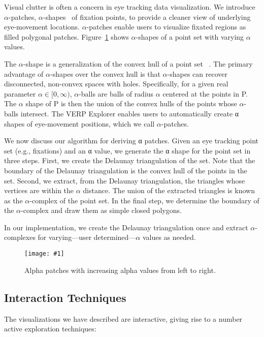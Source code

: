 \documentclass{sigchi}
\newcommand{\insertpicture}[2]{\begin{center}\texttt{[image: \#1]}\end{center}}
\begin{document}
Visual clutter is often a concern in eye tracking data visualization.  We
introduce $\alpha$-patches, $\alpha$-shapes~\cite{Edelsbrunner_1994} of 
fixation points, to provide a cleaner view of underlying eye-movement 
locations. $\alpha$-patches enable users to visualize fixated regions 
as filled polygonal patches. Figure~\ref{fig:alphapatch} shows $\alpha$-shapes 
of a point set with  varying $\alpha$ values.

The $\alpha$-shape is a generalization of the convex hull of a point set
~\cite{Edelsbrunner_1994}. The primary advantage of $\alpha$-shapes over 
the convex hull is that $\alpha$-shapes can recover disconnected, non-convex 
spaces with holes. Specifically, for a given real parameter $\alpha \in [0,\infty)$, 
$\alpha$-balls are balls of radius $\alpha$ centered at the points in P.
The $\alpha$ shape of P is then the union of the convex hulls of the
points whose $\alpha$-balls intersect. The VERP Explorer enables users
to automatically create α shapes of eye-movement positions, which we call
$\alpha$-patches.  

We now discuss our algorithm for deriving α patches. Given an eye
tracking point set (e.g., fixations) and an α value, we generate the α
shape for the point set in three steps. First, we create the Delaunay
triangulation of the set.  Note that the boundary of the Delaunay
triangulation is the convex hull of the points in the set. Second, we
extract, from the Delaunay triangulation, the triangles whose vertices
are within the $\alpha$  distance.   The union of the extracted triangles
is known as the $\alpha$-complex of the point set. In the final step, we
determine the boundary of the $\alpha$-complex and draw them as simple
closed polygons. 
	
In our implementation, we create the Delaunay triangulation once and
extract $\alpha$-complexes for varying---user determined---$\alpha$
values as needed.

	\begin{figure}

		\insertpicture{figures/alphapatch.pdf}{0.5}
		\caption{Alpha patches with increasing alpha values from left to
			right. \label{fig:alphapatch}}

	\end{figure}

\pagebreak

\subsection{Interaction Techniques} 
The visualizations we have described are interactive, giving rise 
to a number active exploration techniques: 
\end{document}
